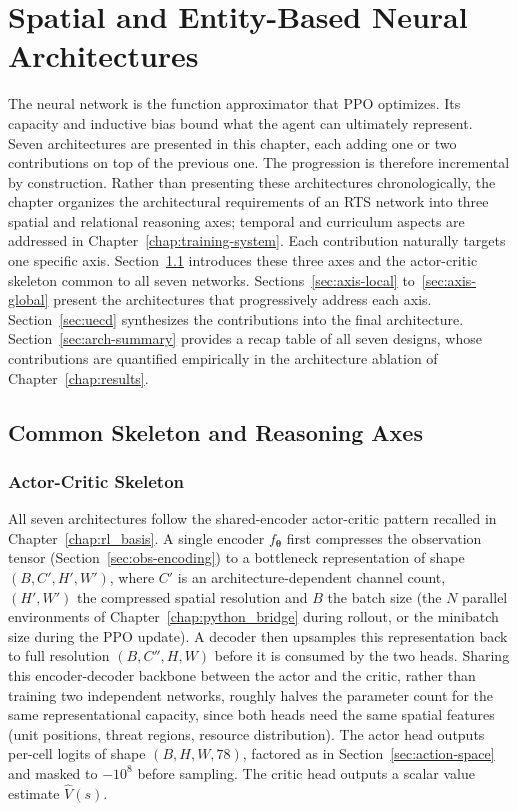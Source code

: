 \chapter{Spatial and Entity-Based Neural Architectures}
\label{chap:architectures}

The neural network is the function approximator that PPO optimizes. Its capacity and inductive bias bound what the agent can ultimately represent. Seven architectures are presented in this chapter, each adding one or two contributions on top of the previous one. The progression is therefore incremental by construction. Rather than presenting these architectures chronologically, the chapter organizes the architectural requirements of an RTS network into three spatial and relational reasoning axes; temporal and curriculum aspects are addressed in Chapter~\ref{chap:training-system}. Each contribution naturally targets one specific axis. Section~\ref{sec:axes} introduces these three axes and the actor-critic skeleton common to all seven networks. Sections~\ref{sec:axis-local} to~\ref{sec:axis-global} present the architectures that progressively address each axis. Section~\ref{sec:uecd} synthesizes the contributions into the final  architecture. Section~\ref{sec:arch-summary} provides a recap table of all seven designs, whose contributions are quantified empirically in the architecture ablation of Chapter~\ref{chap:results}.

\section{Common Skeleton and Reasoning Axes}
\label{sec:axes}

\subsection{Actor-Critic Skeleton}
\label{subsec:skeleton}

All seven architectures follow the shared-encoder actor-critic pattern recalled in Chapter~\ref{chap:rl_basis}. A single encoder $f_{\boldsymbol{\theta}}$ first compresses the observation tensor (Section~\ref{sec:obs-encoding}) to a bottleneck representation of shape $(B, C', H', W')$, where $C'$ is an architecture-dependent channel count, $(H', W')$ the compressed spatial resolution and $B$ the batch size (the $N$ parallel environments of Chapter~\ref{chap:python_bridge} during rollout, or the minibatch size during the PPO update). A decoder then upsamples this representation back to full resolution $(B, C'', H, W)$ before it is consumed by the two heads. Sharing this encoder-decoder backbone between the actor and the critic, rather than training two independent networks, roughly halves the parameter count for the same representational capacity, since both heads need the same spatial features (unit positions, threat regions, resource distribution). The actor head outputs per-cell logits of shape $(B, H, W, 78)$, factored as in Section~\ref{sec:action-space} and masked to $-10^8$ before sampling. The critic head outputs a scalar value estimate $\hat{V}(s)$.

